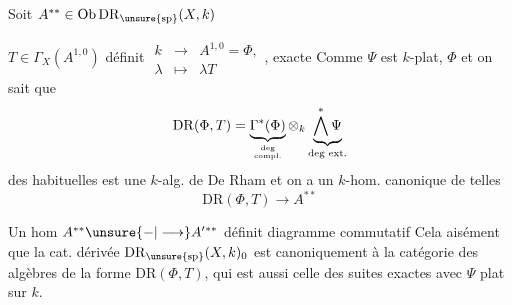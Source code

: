 Soit $A^{**}\in\operatorname{Ob}\mathrm{DR}_{\unsure{\mathrm{sp}}}(X,k)$

$T\in\Gamma_X(A^{1,0})$ définit
$\begin{array}{rcl}k&\longrightarrow&A^{1,0}=\Phi,\\\lambda&\longmapsto&\lambda T\end{array}$,
 exacte
Comme $\Psi$ est $k$-plat, $\Phi$  et on sait que
\[
\mathrm{DR}(\Phi,T)=\underbrace{\Gamma^*(\Phi)}_{\text{deg}\atop\text{compl.}}\otimes_k\underbrace{\bigwedge^*\Psi}_{\text{deg ext.}}
\]
 des   habituelles est une $k$-alg. de De Rham  et on a un $k$-hom. canonique de telles
\[
\mathrm{DR}(\Phi,T)\longrightarrow A^{**}
\]

Un hom $A^{**}\unsure{-|\longrightarrow}A'{}^{**}$ définit diagramme commutatif
Cela  aisément que la cat. dérivée $\mathrm{DR}_{\unsure{\mathrm{sp}}}(X,k)_0$ est  canoniquement à la catégorie   des algèbres de la forme $\mathrm{DR}(\Phi,T)$, qui est aussi celle des suites exactes
avec $\Psi$ plat sur $k$.



